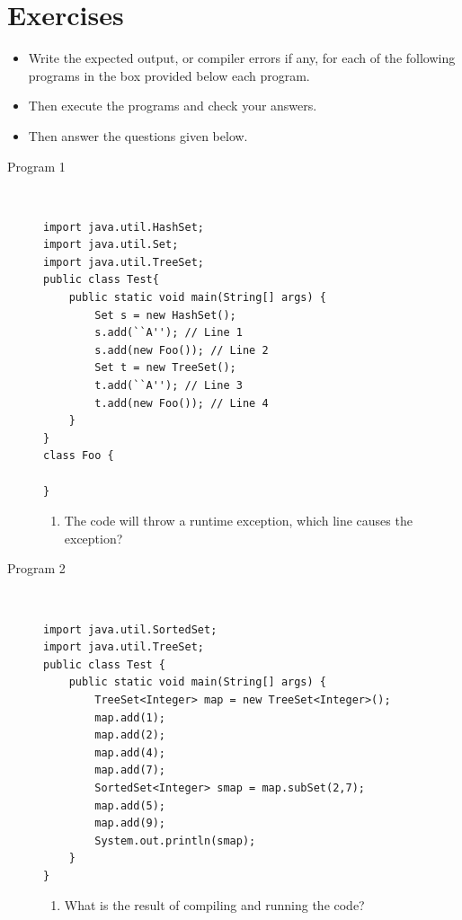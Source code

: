 \documentclass[11pt,a4paper]{article}
\def\AnswerBox{\fbox{\begin{minipage}{4in}\hfill\vspace{0.5in}\end{minipage}}}
\begin{document}
\section*{Exercises}
\begin{itemize}
    \item Write the expected output, or compiler errors if any, for each of the following programs in the box provided below each program.
    \item Then execute the programs and check your answers.
    \item Then answer the questions given below.
\end{itemize}
\begin{description}
    \item [Program 1] \
\begin{lstlisting}
import java.util.HashSet;
import java.util.Set;
import java.util.TreeSet;
public class Test{
    public static void main(String[] args) {
        Set s = new HashSet();
        s.add(``A''); // Line 1
        s.add(new Foo()); // Line 2
        Set t = new TreeSet();
        t.add(``A''); // Line 3
        t.add(new Foo()); // Line 4
    }
}
class Foo {

}
\end{lstlisting}

\AnswerBox

\begin{enumerate}[label=\bfseries Q\arabic*:]\itemsep10pt
 \item The code will throw a runtime exception, which line causes the exception?
 \end{enumerate}

\item [Program 2] \
\begin{lstlisting}
import java.util.SortedSet;
import java.util.TreeSet;
public class Test {
    public static void main(String[] args) {
        TreeSet<Integer> map = new TreeSet<Integer>();
        map.add(1);
        map.add(2);
        map.add(4);
        map.add(7);
        SortedSet<Integer> smap = map.subSet(2,7);
        map.add(5);
        map.add(9);
        System.out.println(smap);
    }
}
\end{lstlisting}

\AnswerBox

\begin{enumerate}[label=\bfseries Q\arabic*:]\itemsep10pt
\item What is the result of compiling and running the code?
\end{enumerate}


\end{description}
\end{document}
